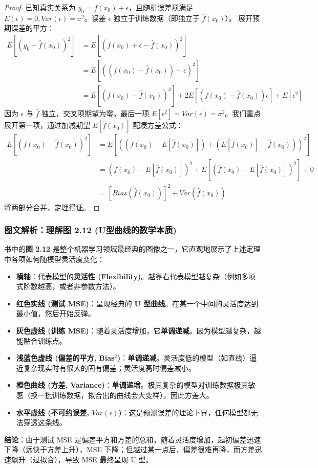 \documentclass[UTF8]{ctexart}
\numberwithin{equation}{section}
\begin{document}
\begin{proof}
已知真实关系为 $y_0 = f(x_0) + \epsilon$，且随机误差项满足 $E(\epsilon)=0, Var(\epsilon)=\sigma^2$。误差 $\epsilon$ 独立于训练数据（即独立于 $\hat{f}(x_0)$）。
展开预期误差的平方：
\begin{align*}
E[(y_0 - \hat{f}(x_0))^2] &= E[(f(x_0) + \epsilon - \hat{f}(x_0))^2] \\
&= E[((f(x_0) - \hat{f}(x_0)) + \epsilon)^2] \\
&= E[(f(x_0) - \hat{f}(x_0))^2] + 2E[(f(x_0) - \hat{f}(x_0))\epsilon] + E[\epsilon^2]
\end{align*}
因为 $\epsilon$ 与 $\hat{f}$ 独立，交叉项期望为零。最后一项 $E[\epsilon^2] = Var(\epsilon) = \sigma^2$。我们重点展开第一项，通过加减期望 $E[\hat{f}(x_0)]$ 配凑方差公式：
\begin{align*}
E[(f(x_0) - \hat{f}(x_0))^2] &= E[( (f(x_0) - E[\hat{f}(x_0)]) + (E[\hat{f}(x_0)] - \hat{f}(x_0)) )^2] \\
&= (f(x_0) - E[\hat{f}(x_0)])^2 + E[(\hat{f}(x_0) - E[\hat{f}(x_0)])^2] + 0 \\
&= [Bias(\hat{f}(x_0))]^2 + Var(\hat{f}(x_0))
\end{align*}
将两部分合并，定理得证。
\end{proof}

\subsubsection{图文解析：理解图 2.12 (U型曲线的数学本质)}

书中的\textbf{图 2.12} 是整个机器学习领域最经典的图像之一，它直观地展示了上述定理中各项如何随模型灵活度变化：
\begin{itemize}
    \item \textbf{横轴}：代表模型的\textbf{灵活性 (Flexibility)}。越靠右代表模型越复杂（例如多项式阶数越高，或者非参数方法）。
    \item \textbf{红色实线 (测试 MSE)}：呈现经典的 \textbf{U 型曲线}。在某一个中间的灵活度达到最小值，然后开始反弹。
    \item \textbf{灰色虚线 (训练 MSE)}：随着灵活度增加，它\textbf{单调递减}。因为模型越复杂，越能贴合训练点。
    \item \textbf{浅蓝色虚线 (偏差的平方, Bias$^2$)}：\textbf{单调递减}。灵活度低的模型（如直线）逼近复杂现实时有很大的固有偏差；灵活度高时偏差减小。
    \item \textbf{橙色曲线 (方差, Variance)}：\textbf{单调递增}。极其复杂的模型对训练数据极其敏感（换一批训练数据，拟合出的曲线会大变样），因此方差大。
    \item \textbf{水平虚线 (不可约误差, $Var(\epsilon)$)}：这是预测误差的理论下界，任何模型都无法穿透这条线。
\end{itemize}
\textbf{结论}：由于测试 MSE 是偏差平方和方差的总和，随着灵活度增加，起初偏差迅速下降（远快于方差上升），MSE 下降；但越过某一点后，偏差很难再降，而方差迅速飙升（过拟合），导致 MSE 最终呈现 U 型。
\end{document}

